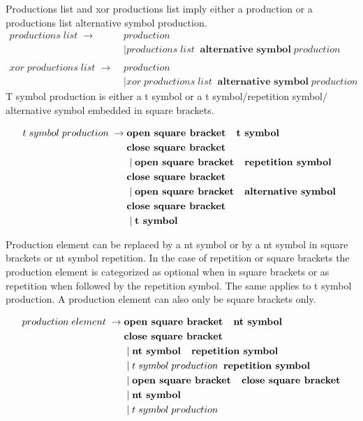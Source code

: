 Productions list and xor productions list imply either a production or a productions list alternative symbol production.
\begin{align*}
        productions\;list\; \rightarrow\; &production \\
               &\mid productions\;list\;\;\textbf{alternative symbol} \;production \\ \\                  
        xor\;productions\;list\; \rightarrow\; &production \\
               &\mid xor\;productions\;list\;\;\textbf{alternative symbol}\;production
\end{align*}
T symbol production is either a t symbol or a t symbol/repetition symbol/ alternative symbol embedded in square brackets.

\begin{align*}
	t\;symbol\;production\; \rightarrow\; & \textbf{open square bracket \; t symbol} \\ &\textbf{close square bracket}\\
               &\mid \textbf{open square bracket \; repetition symbol} \\ &\textbf{close square bracket}\\
               &\mid \textbf{open square bracket \; alternative symbol } \\ &\textbf{close square bracket}\\
               &\mid \textbf{t symbol} 
\end{align*}

Production element can be replaced by a nt symbol or by a nt symbol in square brackets or nt symbol repetition. In the case of repetition or square brackets the production element is categorized as optional when in square brackets or as repetition when followed by the repetition symbol. The same applies to t symbol production. A production element can also only be square brackets only.

 

\begin{align*}
	production\;element\; \rightarrow\; & \textbf{open square bracket \; nt symbol} \\ 
			   &\textbf{close square bracket}\\
               &\mid \textbf{nt symbol \; repetition symbol} \\
               &\mid t\;symbol\;production\;\; \textbf{repetition symbol} \\
               &\mid \textbf{open square bracket \; close square bracket} \\
               &\mid \textbf{nt symbol} \\
               &\mid t\; symbol\; production 
\end{align*}




